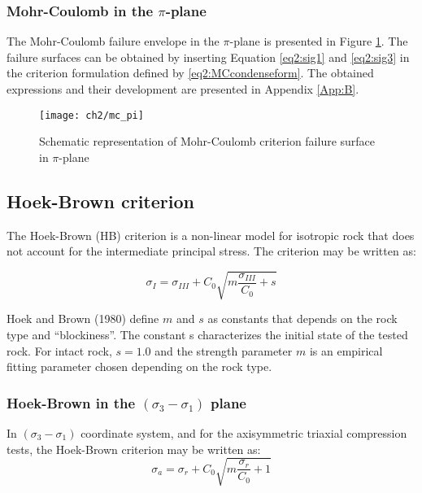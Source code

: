 \subsubsection{Mohr-Coulomb in the \texorpdfstring{$\pi$}{pi}-plane}\label{ch2:MC_pi}

The Mohr-Coulomb failure envelope in the $\pi$-plane is presented in Figure \ref{fig2:mc_pi}. The failure surfaces can be obtained by inserting Equation \ref{eq2:sig1} and \ref{eq2:sig3} in the criterion formulation defined by \ref{eq2:MCcondenseform}. The obtained expressions and their development are presented in Appendix \ref{App:B}. 

\begin{figure}[tb]
    \centering
    \texttt{[image: ch2/mc\_pi]}
    \caption{Schematic representation of Mohr-Coulomb criterion failure surface in  $\pi$-plane}
    \label{fig2:mc_pi}
\end{figure} 

\subsection{Hoek-Brown criterion}

The Hoek-Brown (HB) criterion is a non-linear model for isotropic rock that does not account for the intermediate principal stress. The criterion may be written as:

\begin{equation}\label{eq2:HB-crit}
    \sigma_{I}=\sigma_{III}+C_{0} \sqrt{m \frac{\sigma_{III}}{C_{0}}+s}
\end{equation}

Hoek and Brown (1980) \cite{Hoek1980} define $m$ and $s$  as constants that depends on the rock type and “blockiness”. The constant s characterizes the initial state of the tested rock. For intact rock, $s=1.0$ and the strength parameter $m$ is an empirical fitting parameter chosen depending on the rock type.  

\subsubsection{Hoek-Brown in the \texorpdfstring{$(\sigma_3 -\sigma_1)$}{sigma 3 - sigma 1} plane}

In $(\sigma_3 -\sigma_1)$ coordinate system, and for the axisymmetric triaxial compression tests, the Hoek-Brown criterion may be written as:
\begin{equation}\label{eq2:HBsig1_CTC}
    \sigma_{a}=\sigma_{r}+C_{0} \sqrt{m \frac{\sigma_{r}}{C_{0}}+1}
\end{equation}

